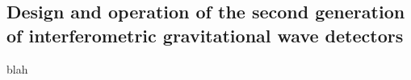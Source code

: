 \subsection{Design and operation of the second generation of interferometric gravitational wave detectors}\label{subsec:2ndgen}

blah